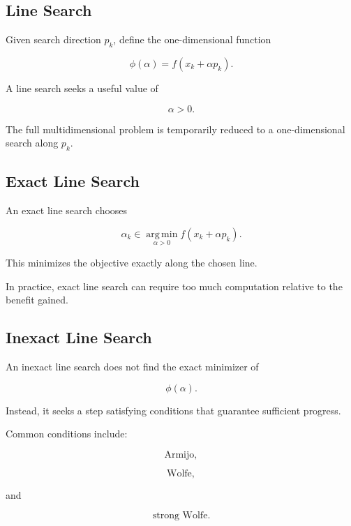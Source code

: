 \subsection{Line Search}
\label{subsec:numerical-line-search}

Given search direction \(p_k\), define the one-dimensional function

\[
\boxed{
\phi(\alpha)
=
f(x_k+\alpha p_k).
}
\]

A line search seeks a useful value of

\[
\alpha>0.
\]

The full multidimensional problem is temporarily reduced to a
one-dimensional search along \(p_k\).

\subsection{Exact Line Search}
\label{subsec:exact-line-search}

An exact line search chooses

\[
\boxed{
\alpha_k
\in
\operatorname*{arg\,min}_{\alpha>0}
f(x_k+\alpha p_k).
}
\]

This minimizes the objective exactly along the chosen line.

In practice, exact line search can require too much computation relative
to the benefit gained.

\subsection{Inexact Line Search}
\label{subsec:inexact-line-search}

An inexact line search does not find the exact minimizer of

\[
\phi(\alpha).
\]

Instead, it seeks a step satisfying conditions that guarantee sufficient
progress.

Common conditions include:

\[
\boxed{
\text{Armijo},
}
\]

\[
\boxed{
\text{Wolfe},
}
\]

and

\[
\boxed{
\text{strong Wolfe}.
}
\]

